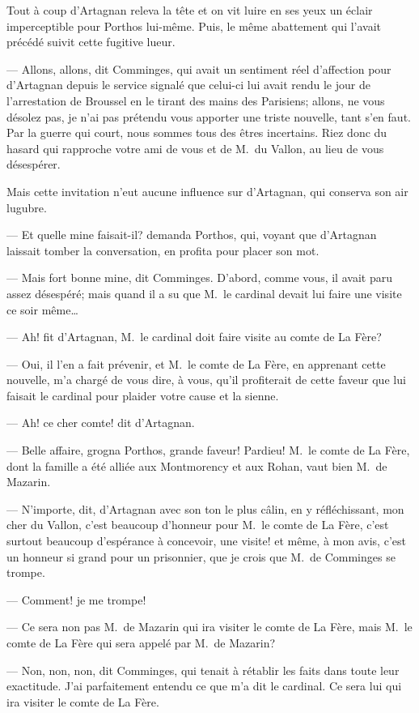 Tout à coup d'Artagnan releva la tête et on vit luire en ses yeux un éclair imperceptible pour Porthos lui-même. Puis, le même abattement qui l'avait précédé suivit cette fugitive lueur.

— Allons, allons, dit Comminges, qui avait un sentiment réel d'affection pour d'Artagnan depuis le service signalé que celui-ci lui avait rendu le jour de l'arrestation de Broussel en le tirant des mains des Parisiens; allons, ne vous désolez pas, je n'ai pas prétendu vous apporter une triste nouvelle, tant s'en faut. Par la guerre qui court, nous sommes tous des êtres incertains. Riez donc du hasard qui rapproche votre ami de vous et de M.~du Vallon, au lieu de vous désespérer.

Mais cette invitation n'eut aucune influence sur d'Artagnan, qui conserva son air lugubre.

— Et quelle mine faisait-il? demanda Porthos, qui, voyant que d'Artagnan laissait tomber la conversation, en profita pour placer son mot.

— Mais fort bonne mine, dit Comminges. D'abord, comme vous, il avait paru assez désespéré; mais quand il a su que M.~le cardinal devait lui faire une visite ce soir même\dots

— Ah! fit d'Artagnan, M.~le cardinal doit faire visite au comte de La Fère?

— Oui, il l'en a fait prévenir, et M.~le comte de La Fère, en apprenant cette nouvelle, m'a chargé de vous dire, à vous, qu'il profiterait de cette faveur que lui faisait le cardinal pour plaider votre cause et la sienne.

— Ah! ce cher comte! dit d'Artagnan.

— Belle affaire, grogna Porthos, grande faveur! Pardieu! M.~le comte de La Fère, dont la famille a été alliée aux Montmorency et aux Rohan, vaut bien M.~de Mazarin.

— N'importe, dit, d'Artagnan avec son ton le plus câlin, en y réfléchissant, mon cher du Vallon, c'est beaucoup d'honneur pour M.~le comte de La Fère, c'est surtout beaucoup d'espérance à concevoir, une visite! et même, à mon avis, c'est un honneur si grand pour un prisonnier, que je crois que M.~de Comminges se trompe.

— Comment! je me trompe!

— Ce sera non pas M.~de Mazarin qui ira visiter le comte de La Fère, mais M.~le comte de La Fère qui sera appelé par M.~de Mazarin?

— Non, non, non, dit Comminges, qui tenait à rétablir les faits dans toute leur exactitude. J'ai parfaitement entendu ce que m'a dit le cardinal. Ce sera lui qui ira visiter le comte de La Fère.

